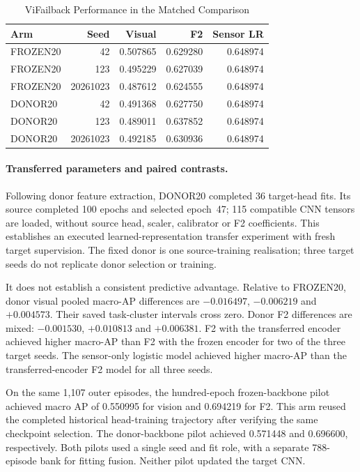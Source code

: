 \begin{table}[htbp]
\caption{ViFailback Performance in the Matched Comparison}\label{tab:vif-matched}
\centering\small

\begin{tabular}{lrrrr}\toprule Arm&Seed&Visual&F2&Sensor LR\\\midrule
FROZEN20&42&0.507865&0.629280&0.648974\\
FROZEN20&123&0.495229&0.627039&0.648974\\
FROZEN20&20261023&0.487612&0.624555&0.648974\\
DONOR20&42&0.491368&0.627750&0.648974\\
DONOR20&123&0.489011&0.637852&0.648974\\
DONOR20&20261023&0.492185&0.630936&0.648974\\\bottomrule
\end{tabular}
\end{table}

\paragraph{Transferred parameters and paired contrasts.}
Following donor feature extraction, DONOR20 completed 36 target-head fits. Its source
completed 100 epochs and selected epoch~47; 115 compatible CNN tensors are loaded,
without source head, scaler, calibrator or F2 coefficients. This establishes an executed
learned-representation transfer experiment with fresh target supervision. The fixed
donor is one source-training realisation; three target seeds do not replicate donor
selection or training.

It does not establish a consistent predictive advantage. Relative to FROZEN20, donor
visual pooled macro-AP differences are $-0.016497$, $-0.006219$ and $+0.004573$. Their
saved task-cluster intervals cross zero. Donor F2 differences are mixed: $-0.001530$,
$+0.010813$ and $+0.006381$. F2 with the transferred encoder achieved higher macro-AP
than F2 with the frozen encoder for two of the three target seeds. The sensor-only
logistic model achieved higher macro-AP than the transferred-encoder F2 model for all
three seeds.

On the same 1,107 outer episodes, the hundred-epoch frozen-backbone pilot achieved macro
AP of 0.550995 for vision and 0.694219 for F2. This arm reused the completed historical
head-training trajectory after verifying the same checkpoint selection. The
donor-backbone pilot achieved 0.571448 and 0.696600, respectively. Both pilots used a
single seed and fit role, with a separate 788-episode bank for fitting fusion. Neither
pilot updated the target CNN.

